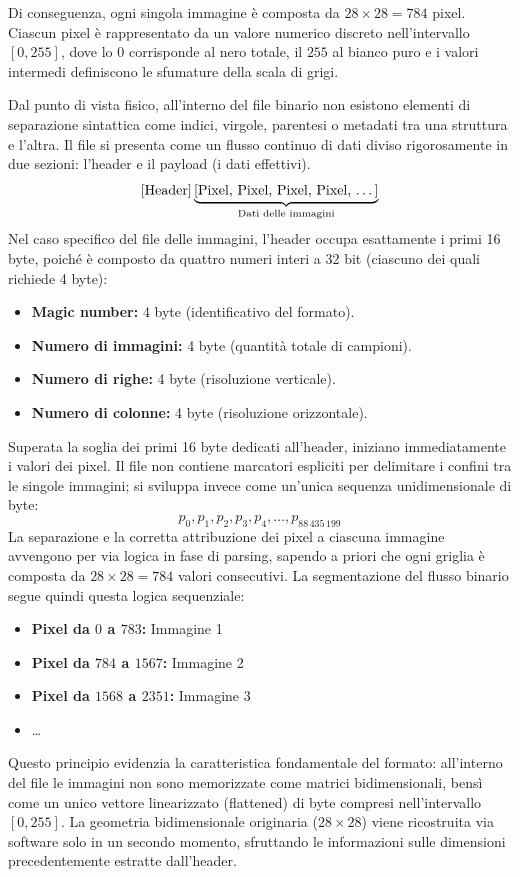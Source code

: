 \documentclass[12pt,a4paper]{article}
\begin{document}
	Di conseguenza, ogni singola immagine è composta da $28 \times 28 = 784$ pixel. Ciascun pixel è rappresentato da un valore numerico discreto nell'intervallo $[0, 255]$, dove lo $0$ corrisponde al nero totale, il $255$ al bianco puro e i valori intermedi definiscono le sfumature della scala di grigi.
	\bigskip

	Dal punto di vista fisico, all'interno del file binario non esistono elementi di separazione sintattica come indici, virgole, parentesi o metadati tra una struttura e l'altra. Il file si presenta come un flusso continuo di dati diviso rigorosamente in due sezioni: l'header e il payload (i dati effettivi).$$\text{[Header]} \underbrace{\text{[Pixel, Pixel, Pixel, Pixel, \dots]}}_{\text{Dati delle immagini}}$$Nel caso specifico del file delle immagini, l'header occupa esattamente i primi 16 byte, poiché è composto da quattro numeri interi a 32 bit (ciascuno dei quali richiede 4 byte):
	\begin{itemize}
		\item \textbf{Magic number:} 4 byte (identificativo del formato).
		\item \textbf{Numero di immagini:} 4 byte (quantità totale di campioni).
		\item \textbf{Numero di righe:} 4 byte (risoluzione verticale).
		\item \textbf{Numero di colonne:} 4 byte (risoluzione orizzontale).
	\end{itemize}

	Superata la soglia dei primi 16 byte dedicati all'header, iniziano immediatamente i valori dei pixel. Il file non contiene marcatori espliciti per delimitare i confini tra le singole immagini; si sviluppa invece come un'unica sequenza unidimensionale di byte:$$p_0, p_1, p_2, p_3, p_4, \dots, p_{88\,435\,199}$$La separazione e la corretta attribuzione dei pixel a ciascuna immagine avvengono per via logica in fase di parsing, sapendo a priori che ogni griglia è composta da $28 \times 28 = 784$ valori consecutivi. La segmentazione del flusso binario segue quindi questa logica sequenziale:
	\begin{itemize}
		\item \textbf{Pixel da $0$ a $783$:} Immagine 1
		\item \textbf{Pixel da $784$ a $1567$:} Immagine 2
		\item \textbf{Pixel da $1568$ a $2351$:} Immagine 3
		\item \dots
	\end{itemize}
	Questo principio evidenzia la caratteristica fondamentale del formato: all'interno del file le immagini non sono memorizzate come matrici bidimensionali, bensì come un unico vettore linearizzato (flattened) di byte compresi nell'intervallo $[0, 255]$. La geometria bidimensionale originaria ($28 \times 28$) viene ricostruita via software solo in un secondo momento, sfruttando le informazioni sulle dimensioni precedentemente estratte dall'header.
\end{document}
